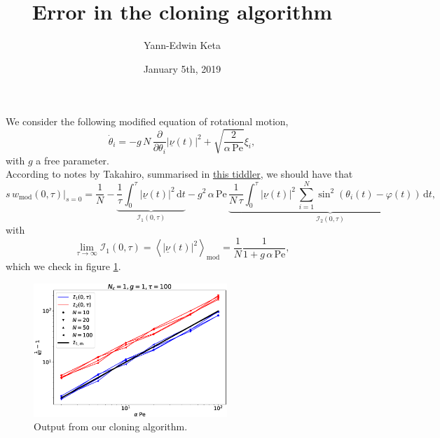 \documentclass[10pt]{article}
\title{\bf Error in the cloning algorithm}
\author{Yann-Edwin Keta}
\date{January 5th, 2019}
\begin{document}
\maketitle

We consider the following modified equation of rotational motion,
\begin{equation}
\dot{\theta}_i = - g \, N \, \frac{\partial}{\partial \theta_i} |\underline{\nu}(t)|^2 + \sqrt{\frac{2}{\alpha \, \text{Pe}}} \xi_i,
\end{equation}
with $g$ a free parameter.\\

According to notes by Takahiro, summarised in \href{https://yketa.github.io/DAMTP_2019_Wiki/#ABP%20cloning%20algorithm}{this tiddler}, we should have that
\begin{equation}
\left. s \, w_{\text{mod}}(0, \tau) \right|_{s=0} =  \frac{1}{N} - \underbrace{\frac{1}{\tau} \int_0^{\tau} |\underline{\nu}(t)|^2 \, \text{d}t}_{\mathcal{I}_1(0, \tau)} - g^2 \, \alpha \, \text{Pe} \, \underbrace{\frac{1}{N \, \tau} \int_0^{\tau} |\underline{\nu}(t)|^2 \, \sum_{i=1}^N \sin^2(\theta_i(t) - \varphi(t)) \, \text{d}t}_{\mathcal{I}_2(0, \tau)},
\label{swmod}
\end{equation}
with
\begin{equation}
\lim_{\tau \rightarrow \infty} \mathcal{I}_1(0, \tau) = \left<|\underline{\nu}(t)|^2\right>_{\text{mod}} = \frac{1}{N}\frac{1}{1 + g \, \alpha \, \text{Pe}},
\label{I1}
\end{equation}
which we check in figure \ref{testI1}.

\begin{figure}[H]
\centering
\includegraphics[width=0.65\textwidth]{testI1.eps}
\caption{Output from our cloning algorithm.}
\label{testI1}
\end{figure}
\end{document}
